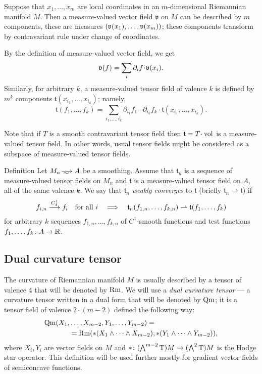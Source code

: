 Suppose that $x_1,\dots,x_m$ are local coordinates in an $m$-dimensional Riemannian manifold $M$.
Then a measure-valued vector field $\mathfrak{v}$ on $M$ can be described by $m$ components, these are measures $(\vv(x_1),\zz\dots,\vv(x_m))$;
these components transform by contravariant rule under change of coordinates.

By the definition of measure-valued vector field, we get
\[\mathfrak{v}(f)=\sum_{i}\partial_i f\cdot \vv(x_i).\]
Similarly, for arbitrary $k$, a measure-valued tensor field of valence $k$ is defined by $m^k$ components 
$\mathfrak{t}(x_{i_1},\dots,x_{i_k})$; namely,
\[\mathfrak{t}(f_1,\dots,f_k)
=
\sum_{i_1,\dots,i_k}
\partial_{i_1} f_1 
\cdots 
\partial_{i_k} f_k
\cdot \mathfrak{t}(x_{i_1},\dots,x_{i_k}).\]

Note that if $T$ is a smooth contravariant tensor field then $\mathfrak{t}=T\cdot \vol$ is a measure-valued tensor field.
In other words, usual tensor fields might be considered as a subspace of measure-valued tensor fields.

\begin{rdef}{Definition}
Let $M_n\smooths{} A$ be a smoothing.
Assume that $\mathfrak{t}_n$ is a sequence of %
 measure-valued tensor fields on $M_n$  and $\mathfrak{t}$ is a measure-valued tensor field on $A$,
all of the same valence $k$.
We say that $\mathfrak{t}_n$ \emph{weakly converges} to  $\mathfrak{t}$
(briefly $\mathfrak{t}_n\rightharpoonup\mathfrak{t}$) if
\[f_{i,n}\smoothto f_i\quad\text{for all\ } i
\quad\Longrightarrow\quad
\mathfrak{t}_n(f_{1,n},\dots,f_{k,n})\zz\rightharpoonup\mathfrak{t}(f_{1},\dots,f_{k})\]
for arbitrary $k$ sequences $f_{1,n},\dots,f_{k,n}$ of $C^1$-smooth functions and test functions $f_1,\dots,f_k\:A\zz\to\RR$.
\end{rdef}

\subsection{Dual curvature tensor}

The curvature of Riemannian manifold $M$ is usually described by a tensor of valence 4 that will be denoted by $\operatorname{\rm Rm}$.
We will use a \emph{dual curvature tensor} --- 
a curvature tensor written in a dual form that will be denoted by $\operatorname{\rm Qm}$;
it is a tensor field of valence $2\cdot(m-2)$ defined the following way:
\begin{align*}
\operatorname{\rm Qm}(X_1,&\dots,X_{m-2},Y_1,\dots,Y_{m-2})
= 
\\
&=
\operatorname{\rm Rm}(*(X_1\wedge\dots\wedge X_{m-2}),*(Y_1\wedge\dots\wedge Y_{m-2})),
\end{align*}
where $X_i,Y_i$ are vector fields on $M$ and  ${*}\:(\bigwedge^{m-2}\T)M\zz\to(\bigwedge^2\T)M$ is the  Hodge star operator.
This definition will be used further mostly for gradient vector fields of semiconcave functions.

